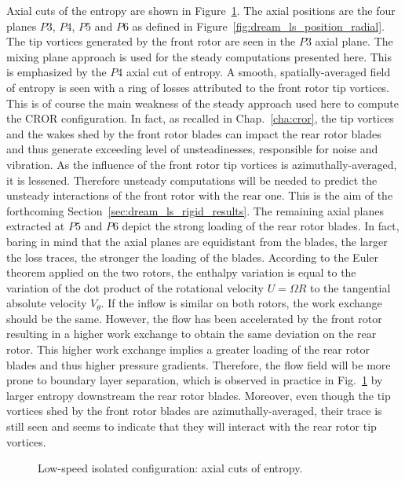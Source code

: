 Axial cuts of the entropy are shown in Figure~\ref{fig:dream_ls_steady_entropy}.
The axial positions are the four planes $P3$, $P4$, $P5$
and $P6$ as defined in Figure~\ref{fig:dream_ls_position_radial}.
The tip vortices generated by the front rotor are seen in the $P3$
axial plane. The mixing plane approach is used for the steady computations
presented here. This is emphasized by the $P4$ axial cut of entropy. A
smooth, spatially-averaged field of entropy is seen with a 
ring of losses attributed to the front rotor tip vortices. This is of course the main
weakness of the steady approach used here to compute the CROR configuration.
In fact, as recalled in Chap.~\ref{cha:cror}, the tip vortices and the wakes shed by the
front rotor blades can impact the rear rotor blades and thus generate
exceeding level of unsteadinesses, responsible for noise and vibration. As the influence
of the front rotor tip vortices is azimuthally-averaged, it is
lessened. Therefore unsteady computations will be needed to
predict the unsteady interactions of the front rotor with the rear one.
This is the aim of the forthcoming Section~\ref{sec:dream_ls_rigid_results}.
The remaining axial planes extracted at $P5$ and $P6$ depict the strong loading
of the rear rotor blades. In fact, baring in mind that the
axial planes are equidistant from the blades, the larger the loss traces,
the stronger the loading of the blades. 
According to the Euler theorem applied on the two
rotors, the enthalpy variation is equal to the variation of 
the dot product of the rotational 
velocity $U=\Omega R$ to the tangential absolute velocity
$V_\theta$. If the inflow is similar on both rotors,
the work exchange should be the same. However,
the flow has been accelerated by the front rotor
resulting in a higher work exchange to obtain
the same deviation on the rear rotor.
This higher work exchange implies 
a greater loading of the rear rotor blades and thus
higher pressure gradients. Therefore,
the flow field will be more prone to boundary layer
separation, which is observed in practice in 
Fig.~\ref{fig:dream_ls_steady_entropy} by larger entropy
downstream the rear rotor blades.
Moreover, even though the
tip vortices shed by the front rotor 
blades are azimuthally-averaged,
their trace is still seen and seems to indicate that they will
interact with the rear rotor tip vortices.
\begin{figure}[htp]
  \centering
  \caption{Low-speed isolated configuration: axial cuts of entropy.}
   \label{fig:dream_ls_steady_entropy}
\end{figure}
